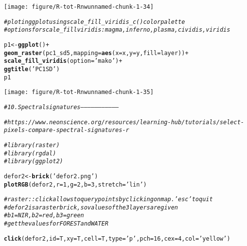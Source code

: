 \documentclass{article}\usepackage[]{graphicx}\usepackage[]{color}
\makeatletter
\newcommand{\hlnum}[1]{\textcolor[rgb]{0.686,0.059,0.569}{#1}}%
\newcommand{\hlstr}[1]{\textcolor[rgb]{0.192,0.494,0.8}{#1}}%
\newcommand{\hlcom}[1]{\textcolor[rgb]{0.678,0.584,0.686}{\textit{#1}}}%
\newcommand{\hlopt}[1]{\textcolor[rgb]{0,0,0}{#1}}%
\newcommand{\hlstd}[1]{\textcolor[rgb]{0.345,0.345,0.345}{#1}}%
\newcommand{\hlkwb}[1]{\textcolor[rgb]{0.69,0.353,0.396}{#1}}%
\newcommand{\hlkwc}[1]{\textcolor[rgb]{0.333,0.667,0.333}{#1}}%
\newcommand{\hlkwd}[1]{\textcolor[rgb]{0.737,0.353,0.396}{\textbf{#1}}}%
\newenvironment{kframe}{%
 \def\at@end@of@kframe{}%
 \ifinner\ifhmode%
  \def\at@end@of@kframe{\end{minipage}}%
  \begin{minipage}{\columnwidth}%
 \fi\fi%
 \def\FrameCommand##1{\hskip\@totalleftmargin \hskip-\fboxsep
 \colorbox{shadecolor}{##1}\hskip-\fboxsep
     \hskip-\linewidth \hskip-\@totalleftmargin \hskip\columnwidth}%
 \MakeFramed {\advance\hsize-\width
   \@totalleftmargin\z@ \linewidth\hsize
   \@setminipage}}%
 {\par\unskip\endMakeFramed%
 \at@end@of@kframe}
\newenvironment{knitrout}{}{} %
\makeatother
\begin{document}
\begin{knitrout}
{\centering \texttt{[image: figure/R-tot-Rnwunnamed-chunk-1-34]} 

}


\begin{kframe}\begin{alltt}
\hlcom{# plot in ggplot using scale_fill_viridis_c() color palette}
\hlcom{# options for scale_fill viridis: magma, inferno, plasma, cividis, viridis}

\hlstd{p1} \hlkwb{<-} \hlkwd{ggplot}\hlstd{()}\hlopt{+}
  \hlkwd{geom_raster}\hlstd{(pc1_sd5,} \hlkwc{mapping} \hlstd{=} \hlkwd{aes}\hlstd{(}\hlkwc{x} \hlstd{= x,} \hlkwc{y} \hlstd{= y,} \hlkwc{fill} \hlstd{= layer))} \hlopt{+}
  \hlkwd{scale_fill_viridis}\hlstd{(}\hlkwc{option} \hlstd{=} \hlstr{'mako'}\hlstd{)} \hlopt{+}
  \hlkwd{ggtitle}\hlstd{(}\hlstr{'PC1 SD'}\hlstd{)}
\hlstd{p1}
\end{alltt}
\end{kframe}

{\centering \texttt{[image: figure/R-tot-Rnwunnamed-chunk-1-35]} 

}


\begin{kframe}\begin{alltt}
\hlcom{# 10. Spectral signatures---------------------------------}

\hlcom{# https://www.neonscience.org/resources/learning-hub/tutorials/select-pixels-compare-spectral-signatures-r}

\hlcom{# library(raster)}
\hlcom{# library(rgdal)}
\hlcom{# library(ggplot2)}

\hlstd{defor2} \hlkwb{<-} \hlkwd{brick}\hlstd{(}\hlstr{'defor2.png'}\hlstd{)}
\hlkwd{plotRGB}\hlstd{(defor2,} \hlkwc{r} \hlstd{=} \hlnum{1}\hlstd{,} \hlkwc{g} \hlstd{=} \hlnum{2}\hlstd{,} \hlkwc{b} \hlstd{=} \hlnum{3}\hlstd{,} \hlkwc{stretch} \hlstd{=} \hlstr{'lin'}\hlstd{)}

\hlcom{# raster::click allows to query points by clicking on map. 'esc' to quit}
\hlcom{# defor2 is a raster brick, so values of the 3 layers are given}
\hlcom{# b1 =  NIR, b2 = red, b3 = green}
\hlcom{# get the values for FOREST and WATER}

\hlkwd{click}\hlstd{(defor2,} \hlkwc{id} \hlstd{= T,} \hlkwc{xy} \hlstd{= T,} \hlkwc{cell} \hlstd{= T,} \hlkwc{type} \hlstd{=} \hlstr{'p'}\hlstd{,} \hlkwc{pch} \hlstd{=} \hlnum{16}\hlstd{,} \hlkwc{cex} \hlstd{=} \hlnum{4}\hlstd{,} \hlkwc{col} \hlstd{=} \hlstr{'yellow'}\hlstd{)}
\end{alltt}
\end{kframe}


\end{knitrout}
\end{document}
